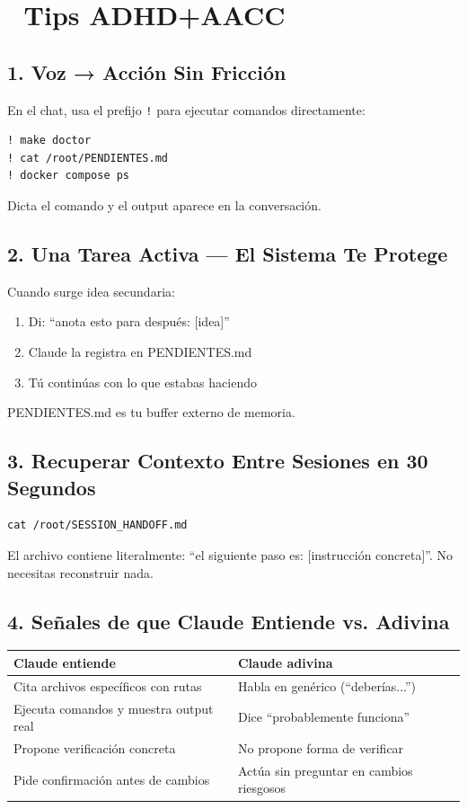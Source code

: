 \documentclass[11pt,a4paper,spanish]{article}
\begin{document}
\section{🧠 Tips ADHD+AACC}

\subsection*{1. Voz → Acción Sin Fricción}

En el chat, usa el prefijo \texttt{!} para ejecutar comandos directamente:

\begin{lstlisting}
! make doctor
! cat /root/PENDIENTES.md
! docker compose ps
\end{lstlisting}

Dicta el comando y el output aparece en la conversación.

\subsection*{2. Una Tarea Activa — El Sistema Te Protege}

Cuando surge idea secundaria:
\begin{enumerate}
  \item Di: ``anota esto para después: [idea]''
  \item Claude la registra en PENDIENTES.md
  \item Tú continúas con lo que estabas haciendo
\end{enumerate}

PENDIENTES.md es tu buffer externo de memoria.

\subsection*{3. Recuperar Contexto Entre Sesiones en 30 Segundos}

\begin{lstlisting}
cat /root/SESSION_HANDOFF.md
\end{lstlisting}

El archivo contiene literalmente: ``el siguiente paso es: [instrucción concreta]''. No necesitas reconstruir nada.

\subsection*{4. Señales de que Claude Entiende vs. Adivina}

\begin{tabular}{|p{3.5cm}|p{3.5cm}|}
\hline
\textbf{Claude entiende} & \textbf{Claude adivina} \\
\hline
Cita archivos específicos con rutas & Habla en genérico (``deberías...'') \\
Ejecuta comandos y muestra output real & Dice ``probablemente funciona'' \\
Propone verificación concreta & No propone forma de verificar \\
Pide confirmación antes de cambios & Actúa sin preguntar en cambios riesgosos \\
\hline
\end{tabular}
\end{document}
